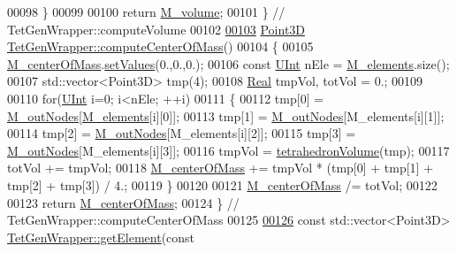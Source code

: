 \begin{DoxyCode}
00098     \}
00099 
00100     \textcolor{keywordflow}{return} \hyperlink{classFVCode3D_1_1TetGenWrapper_a820391e6d290e49db68b107fd5ab0e75}{M\_volume};
00101 \} \textcolor{comment}{// TetGenWrapper::computeVolume}
00102 
\hypertarget{TetGenWrapper_8cpp_source.tex_l00103}{}\hyperlink{classFVCode3D_1_1TetGenWrapper_ad3574fde5de1292dc9064d717a3ee353}{00103} \hyperlink{classFVCode3D_1_1Point3D}{Point3D} \hyperlink{classFVCode3D_1_1TetGenWrapper_ad3574fde5de1292dc9064d717a3ee353}{TetGenWrapper::computeCenterOfMass}()
00104 \{
00105     \hyperlink{classFVCode3D_1_1TetGenWrapper_a4c2e389ea6cc0cec7c83b7e241976807}{M\_centerOfMass}.\hyperlink{classFVCode3D_1_1Point3D_af250a1c49cf1aeeb52f59a687257451d}{setValues}(0.,0.,0.);
00106     \textcolor{keyword}{const} \hyperlink{namespaceFVCode3D_a4bf7e328c75d0fd504050d040ebe9eda}{UInt} nEle = \hyperlink{classFVCode3D_1_1TetGenWrapper_a016da330a68cb7cd44881dc26efed5b5}{M\_elements}.size();
00107     std::vector<Point3D> tmp(4);
00108     \hyperlink{namespaceFVCode3D_a40c1f5588a248569d80aa5f867080e83}{Real} tmpVol, totVol = 0.;
00109 
00110     \textcolor{keywordflow}{for}(\hyperlink{namespaceFVCode3D_a4bf7e328c75d0fd504050d040ebe9eda}{UInt} i=0; i<nEle; ++i)
00111     \{
00112         tmp[0] = \hyperlink{classFVCode3D_1_1TetGenWrapper_a04672b7a2b60730190e0e82af43ed38b}{M\_outNodes}[\hyperlink{classFVCode3D_1_1TetGenWrapper_a016da330a68cb7cd44881dc26efed5b5}{M\_elements}[i][0]];
00113         tmp[1] = \hyperlink{classFVCode3D_1_1TetGenWrapper_a04672b7a2b60730190e0e82af43ed38b}{M\_outNodes}[M\_elements[i][1]];
00114         tmp[2] = \hyperlink{classFVCode3D_1_1TetGenWrapper_a04672b7a2b60730190e0e82af43ed38b}{M\_outNodes}[M\_elements[i][2]];
00115         tmp[3] = \hyperlink{classFVCode3D_1_1TetGenWrapper_a04672b7a2b60730190e0e82af43ed38b}{M\_outNodes}[M\_elements[i][3]];
00116         tmpVol = \hyperlink{namespaceFVCode3D_a8a6b07162e2801b628c3bd4057b9f221}{tetrahedronVolume}(tmp);
00117         totVol += tmpVol;
00118         \hyperlink{classFVCode3D_1_1TetGenWrapper_a4c2e389ea6cc0cec7c83b7e241976807}{M\_centerOfMass} += tmpVol * (tmp[0] + tmp[1] + tmp[2] + tmp[3]) / 4.;
00119     \}
00120 
00121     \hyperlink{classFVCode3D_1_1TetGenWrapper_a4c2e389ea6cc0cec7c83b7e241976807}{M\_centerOfMass} /= totVol;
00122 
00123     \textcolor{keywordflow}{return} \hyperlink{classFVCode3D_1_1TetGenWrapper_a4c2e389ea6cc0cec7c83b7e241976807}{M\_centerOfMass};
00124 \} \textcolor{comment}{// TetGenWrapper::computeCenterOfMass}
00125 
\hypertarget{TetGenWrapper_8cpp_source.tex_l00126}{}\hyperlink{classFVCode3D_1_1TetGenWrapper_aa078ba35c38e79cae708b7fd632ceac4}{00126} \textcolor{keyword}{const} std::vector<Point3D> \hyperlink{classFVCode3D_1_1TetGenWrapper_aa078ba35c38e79cae708b7fd632ceac4}{TetGenWrapper::getElement}(\textcolor{keyword}{const} 

\end{DoxyCode}
